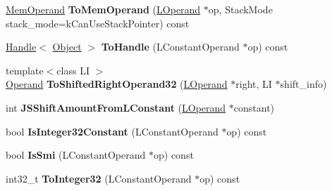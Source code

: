 \begin{DoxyCompactItemize}
\item 
\hyperlink{classv8_1_1internal_1_1_mem_operand}{Mem\+Operand} {\bfseries To\+Mem\+Operand} (\hyperlink{classv8_1_1internal_1_1_l_operand}{L\+Operand} $\ast$op, Stack\+Mode stack\+\_\+mode=k\+Can\+Use\+Stack\+Pointer) const \hypertarget{classv8_1_1internal_1_1_l_code_gen_a2fa756129548b7f7e67bd66a4a6d4160}{}\label{classv8_1_1internal_1_1_l_code_gen_a2fa756129548b7f7e67bd66a4a6d4160}

\item 
\hyperlink{classv8_1_1internal_1_1_handle}{Handle}$<$ \hyperlink{classv8_1_1internal_1_1_object}{Object} $>$ {\bfseries To\+Handle} (L\+Constant\+Operand $\ast$op) const \hypertarget{classv8_1_1internal_1_1_l_code_gen_ab75f8785eb99d07a1585c9402a3b4d5e}{}\label{classv8_1_1internal_1_1_l_code_gen_ab75f8785eb99d07a1585c9402a3b4d5e}

\item 
{\footnotesize template$<$class LI $>$ }\\\hyperlink{classv8_1_1internal_1_1_operand}{Operand} {\bfseries To\+Shifted\+Right\+Operand32} (\hyperlink{classv8_1_1internal_1_1_l_operand}{L\+Operand} $\ast$right, LI $\ast$shift\+\_\+info)\hypertarget{classv8_1_1internal_1_1_l_code_gen_a41fb6c7c90301ca1807095393cd3d5ca}{}\label{classv8_1_1internal_1_1_l_code_gen_a41fb6c7c90301ca1807095393cd3d5ca}

\item 
int {\bfseries J\+S\+Shift\+Amount\+From\+L\+Constant} (\hyperlink{classv8_1_1internal_1_1_l_operand}{L\+Operand} $\ast$constant)\hypertarget{classv8_1_1internal_1_1_l_code_gen_a6337482e7af19e64b7434b5e8dce26cd}{}\label{classv8_1_1internal_1_1_l_code_gen_a6337482e7af19e64b7434b5e8dce26cd}

\item 
bool {\bfseries Is\+Integer32\+Constant} (L\+Constant\+Operand $\ast$op) const \hypertarget{classv8_1_1internal_1_1_l_code_gen_a5881f4e22804c55738fa9243f04a9a6e}{}\label{classv8_1_1internal_1_1_l_code_gen_a5881f4e22804c55738fa9243f04a9a6e}

\item 
bool {\bfseries Is\+Smi} (L\+Constant\+Operand $\ast$op) const \hypertarget{classv8_1_1internal_1_1_l_code_gen_ae0339cb277e927ff5d2073eb7790018a}{}\label{classv8_1_1internal_1_1_l_code_gen_ae0339cb277e927ff5d2073eb7790018a}

\item 
int32\+\_\+t {\bfseries To\+Integer32} (L\+Constant\+Operand $\ast$op) const \hypertarget{classv8_1_1internal_1_1_l_code_gen_a477ff533f07d93b0e1ca5f9290beea36}{}\label{classv8_1_1internal_1_1_l_code_gen_a477ff533f07d93b0e1ca5f9290beea36}


\end{DoxyCompactItemize}
